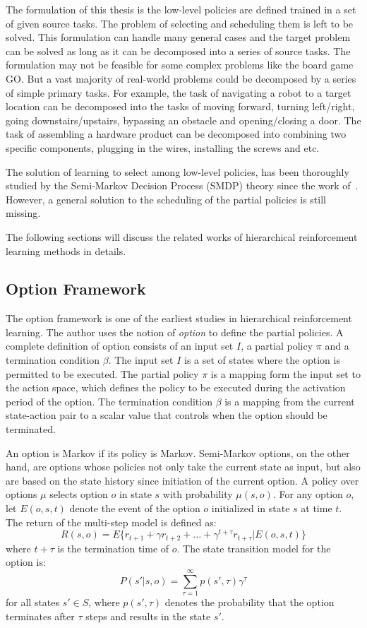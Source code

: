 The formulation of this thesis is the low-level policies are defined trained in a set of given source tasks. The problem of selecting and scheduling them is left to be solved. This formulation can handle many general cases and the target problem can be solved as long as it can be decomposed into a series of source tasks. The formulation may not be feasible for some complex problems like the board game GO. But a vast majority of real-world problems could be decomposed by a series of simple primary tasks. For example, the task of navigating a robot to a target location can be decomposed into the tasks of moving forward, turning left/right, going downstairs/upstairs, bypassing an obstacle and opening/closing a door. The task of assembling a hardware product can be decomposed into combining two specific components, plugging in the wires, installing the screws and etc.

The solution of learning to select among low-level policies, has been thoroughly studied by the Semi-Markov Decision Process (SMDP) theory since the work of~\cite{sutton1999between}. However, a general solution to the scheduling of the partial policies is still missing.

The following sections will discuss the related works of hierarchical reinforcement learning methods in details.

\subsection{Option Framework}
The option framework \cite{sutton1999between} is one of the earliest studies in hierarchical reinforcement learning. The author uses the notion of \textit{option} to define the partial policies. A complete definition of option consists of an input set $I$, a partial policy $\pi$ and a termination condition $\beta$. The input set $I$ is a set of states where the option is permitted to be executed. The partial policy $\pi$ is a mapping form the input set to the action space, which defines the policy to be executed during the activation period of the option. The termination condition $\beta$ is a mapping from the current state-action pair to a scalar value that controls when the option should be terminated.

An option is Markov if its policy is Markov. Semi-Markov options, on the other hand, are options whose policies not only take the current state as input, but also are based on the state history since initiation of the current option. A policy over options \(\mu \) selects option \(o\) in state \(s\) with probability \(\mu(s,o)\). 
For any option \(o\), let \(E(o,s,t)\) denote the event of the option $o$ initialized in state $s$ at time $t$. The return of the multi-step model is defined as:
\[ R(s,o)=E\{r_{t+1}+\gamma r_{t+2}+\ldots+\gamma^{t+\tau} r_{t+\tau} \lvert E(o,s,t)\} \]
where $t+\tau$ is the termination time of $o$. The state transition model for the option is:
\[P(s' \lvert s,o)=\sum_{\tau=1}^{\infty} p(s',\tau) \gamma^\tau \]
for all states \(s' \in S \), where \( p(s',\tau) \) denotes the probability that the option terminates after \(\tau\) steps and results in the state \(s'\).

